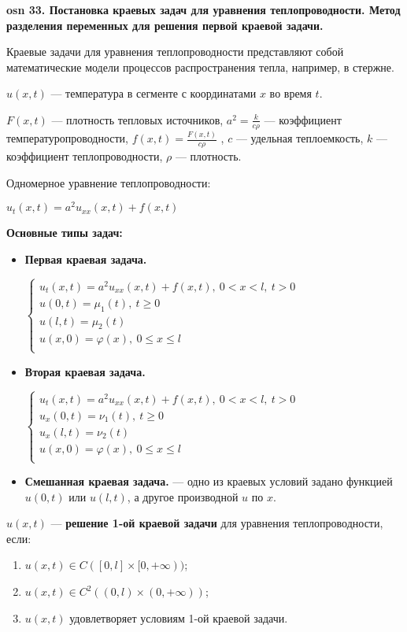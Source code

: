 \textbf{\LARGE osn 33. Постановка краевых задач для уравнения теплопроводности.  Метод разделения переменных для решения первой краевой задачи.}

Краевые задачи для уравнения теплопроводности представляют собой математические модели процессов распространения тепла, например, в стержне.
    
$u(x,t)$ --- температура в сегменте с координатами $x$ во время $t$.

$F(x, t)$ --- плотность тепловых источников, $a^2 = \frac{k}{c\rho}$ --- коэффициент температуропроводности, $f(x,t)=\frac{F(x,t)}{c\rho}$ , $c$ --- удельная теплоемкость, $k$ --- коэффициент теплопроводности, $\rho$ --- плотность.

\bigbreak

Одномерное уравнение теплопроводности:

$u_t(x,t)=a^2u_{xx}(x,t)+f(x,t)$


\textbf{Основные типы задач:}
\begin{itemize}
    \item \textbf{Первая краевая задача.}
    
    $\begin{cases}
    u_t(x,t)=a^2u_{xx}(x,t)+f(x,t),~0<x<l,~t>0&\\
    u(0,t)=\mu_1(t),~t\geqslant0&\\
    u(l,t)=\mu_2(t)&\\
    u(x,0)=\varphi(x),~0\leqslant x\leqslant l&\\
    \end{cases}$
    \item \textbf{Вторая краевая задача.}
    
    $\begin{cases}
    u_t(x,t)=a^2u_{xx}(x,t)+f(x,t),~0<x<l,~t>0&\\
    u_x(0,t)=\nu_1(t),~t\geqslant0&\\
    u_x(l,t)=\nu_2(t)&\\
    u(x,0)=\varphi(x),~0\leqslant x\leqslant l&\\
    \end{cases}$
    \item \textbf{Смешанная краевая задача.} --- одно из краевых условий задано функцией $u(0,t)$ или $u(l,t)$, а другое производной $u$ по $x$.
\end{itemize}

$u(x,t)$ --- \textbf{решение 1-ой краевой задачи} для уравнения теплопроводности, если:
\begin{enumerate}
    \item $u(x,t)\in C([0,l]\times[0,+\infty))$;
    \item $u(x,t)\in C^2((0,l)\times(0,+\infty))$;
    \item $u(x,t)$ удовлетворяет условиям 1-ой краевой задачи.
\end{enumerate}

